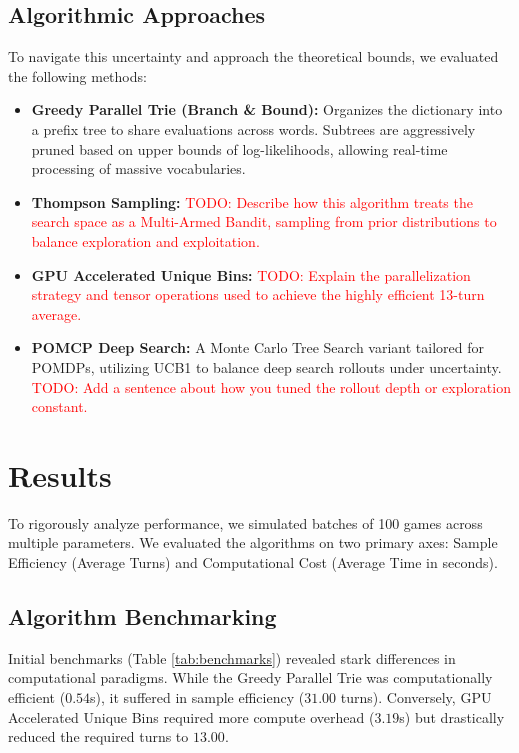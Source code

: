\documentclass[12pt, a4paper]{article}
\begin{document}
\subsection{Algorithmic Approaches}
To navigate this uncertainty and approach the theoretical bounds, we evaluated the following methods:
\begin{itemize}
    \item \textbf{Greedy Parallel Trie (Branch \& Bound):} Organizes the dictionary into a prefix tree to share evaluations across words. Subtrees are aggressively pruned based on upper bounds of log-likelihoods, allowing real-time processing of massive vocabularies.
    \item \textbf{Thompson Sampling:} \textcolor{red}{TODO: Describe how this algorithm treats the search space as a Multi-Armed Bandit, sampling from prior distributions to balance exploration and exploitation.}
    \item \textbf{GPU Accelerated Unique Bins:} \textcolor{red}{TODO: Explain the parallelization strategy and tensor operations used to achieve the highly efficient 13-turn average.}
    \item \textbf{POMCP Deep Search:} A Monte Carlo Tree Search variant tailored for POMDPs, utilizing UCB1 to balance deep search rollouts under uncertainty. \textcolor{red}{TODO: Add a sentence about how you tuned the rollout depth or exploration constant.}
\end{itemize}

\section{Results}

To rigorously analyze performance, we simulated batches of 100 games across multiple parameters. We evaluated the algorithms on two primary axes: Sample Efficiency (Average Turns) and Computational Cost (Average Time in seconds).

\subsection{Algorithm Benchmarking}
Initial benchmarks (Table \ref{tab:benchmarks}) revealed stark differences in computational paradigms. While the Greedy Parallel Trie was computationally efficient ($0.54$s), it suffered in sample efficiency ($31.00$ turns). Conversely, GPU Accelerated Unique Bins required more compute overhead ($3.19$s) but drastically reduced the required turns to $13.00$.
\end{document}
